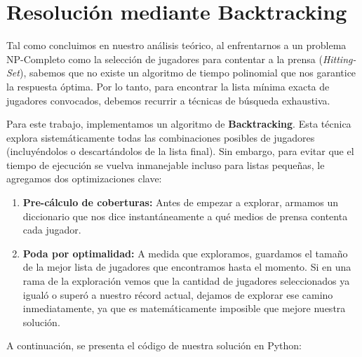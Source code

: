 \section{Resolución mediante Backtracking}

Tal como concluimos en nuestro análisis teórico, al enfrentarnos a un problema NP-Completo como la selección de jugadores para contentar a la prensa (\textit{Hitting-Set}), sabemos que no existe un algoritmo de tiempo polinomial que nos garantice la respuesta óptima. Por lo tanto, para encontrar la lista mínima exacta de jugadores convocados, debemos recurrir a técnicas de búsqueda exhaustiva. 

Para este trabajo, implementamos un algoritmo de \textbf{Backtracking}. Esta técnica explora sistemáticamente todas las combinaciones posibles de jugadores (incluyéndolos o descartándolos de la lista final). Sin embargo, para evitar que el tiempo de ejecución se vuelva inmanejable incluso para listas pequeñas, le agregamos dos optimizaciones clave:
\begin{enumerate}
    \item \textbf{Pre-cálculo de coberturas:} Antes de empezar a explorar, armamos un diccionario que nos dice instantáneamente a qué medios de prensa contenta cada jugador.
    \item \textbf{Poda por optimalidad:} A medida que exploramos, guardamos el tamaño de la mejor lista de jugadores que encontramos hasta el momento. Si en una rama de la exploración vemos que la cantidad de jugadores seleccionados ya igualó o superó a nuestro récord actual, dejamos de explorar ese camino inmediatamente, ya que es matemáticamente imposible que mejore nuestra solución.
\end{enumerate}

A continuación, se presenta el código de nuestra solución en Python:

